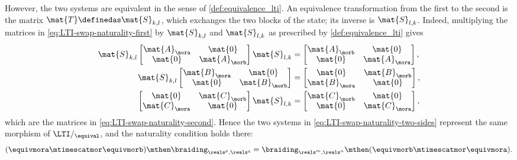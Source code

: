 \begin{example}
    However, the two systems are equivalent in the sense of \cref{def:equivalence_lti}.
    An equivalence transformation from the first to the second is the matrix $\mat{T} \definedas \mat{S}_{k,l}$, which exchanges the two blocks of the state; its inverse is $\mat{S}_{l,k}$.
    Indeed, multiplying the matrices in \cref{eq:LTI-swap-naturality-first} by $\mat{S}_{k,l}$ and $\mat{S}_{l,k}$ as prescribed by \cref{def:equivalence_lti} gives
    \begin{equation}
        \begin{aligned}
            \mat{S}_{k,l}
            \begin{bmatrix}
                \mat{A}_\mora & \mat{0}       \\
                \mat{0}       & \mat{A}_\morb
            \end{bmatrix}
            \mat{S}_{l,k}
             & =
            \begin{bmatrix}
                \mat{A}_\morb & \mat{0}       \\
                \mat{0}       & \mat{A}_\mora
            \end{bmatrix},
            \\
            \mat{S}_{k,l}
            \begin{bmatrix}
                \mat{B}_\mora & \mat{0}       \\
                \mat{0}       & \mat{B}_\morb
            \end{bmatrix}
             & =
            \begin{bmatrix}
                \mat{0}       & \mat{B}_\morb \\
                \mat{B}_\mora & \mat{0}
            \end{bmatrix},
            \\
            \begin{bmatrix}
                \mat{0}       & \mat{C}_\morb \\
                \mat{C}_\mora & \mat{0}
            \end{bmatrix}
            \mat{S}_{l,k}
             & =
            \begin{bmatrix}
                \mat{C}_\morb & \mat{0}       \\
                \mat{0}       & \mat{C}_\mora
            \end{bmatrix},
        \end{aligned}
    \end{equation}
    which are the matrices in \cref{eq:LTI-swap-naturality-second}.
    Hence the two systems in \cref{eq:LTI-swap-naturality-two-sides} represent the same morphism of $\LTI/_{\equival}$, and the naturality condition holds there:
    \begin{equation}
        (\equivmora \mtimescatmor \equivmorb) \mthen \braiding_{\reals^p,\reals^q}
        =
        \braiding_{\reals^m,\reals^n} \mthen (\equivmorb \mtimescatmor \equivmora).
    \end{equation}


\end{example}
